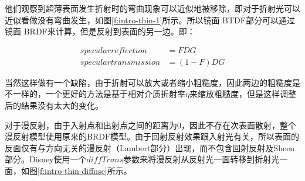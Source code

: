 他们观察到超薄表面发生折射时的弯曲现象可以近似地被移除，即对于折射光可以近似看做没有弯曲发生，如图\ref{f:intro-thin-1}所示。所以镜面 BTDF部分可以通过镜面 BRDF来计算，但是反射到表面的另一边。即：

\begin{equation}
	\begin{aligned}
		specular reflection &= FDG\\
specular transmission &= (1-F)DG
	\end{aligned}
\end{equation}

当然这样做有一个缺陷，由于折射可以放大或者缩小粗糙度，因此两边的粗糙度是不一样的，一个更好的方法是基于相对介质折射率$\eta$来缩放粗糙度，但是这样调整后的结果没有太大的变化。

对于漫反射，由于入射点和出射点之间的距离为0，因此不存在次表面散射，整个漫反射模型使用原来的BRDF模型。由于回射反射效果跟入射光有关，所以表面的反面仅有与方向无关的漫反射（Lambert部分）出现，而不包含回射反射及Sheen部分。Disney使用一个$diffTrans$参数来将漫反射从反射光一面转移到折射光一面，如图\ref{f:intro-thin-diffuse}所示。


